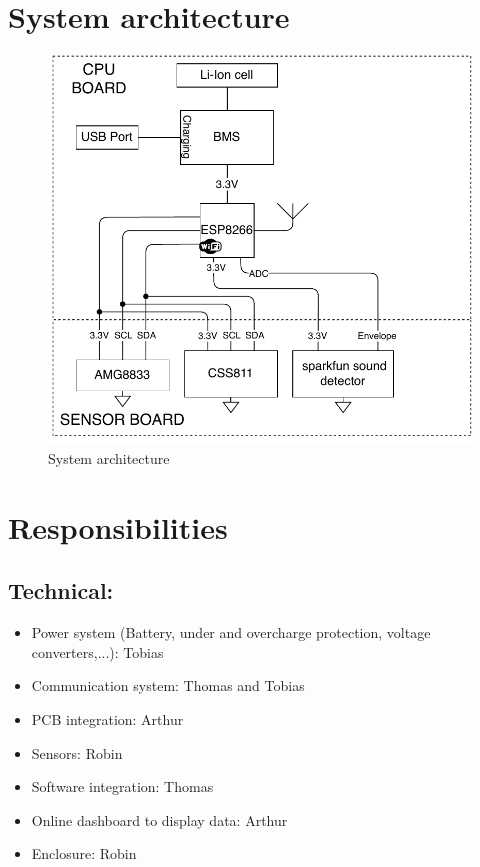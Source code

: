 \documentclass[11pt,a4paper]{article}
\begin{document}
	\section{System architecture}
	\begin{figure}[!ht]
		\centering
		\includegraphics[width=1\linewidth]{architecture.pdf}
		\caption{System architecture}
		\label{fig:situation}
	\end{figure} 

	\section{Responsibilities}
	\subsection{Technical:}
	\begin{itemize}
		\item Power system (Battery, under and overcharge protection, voltage converters,...): Tobias
		\item Communication system: Thomas and Tobias
		\item PCB integration: Arthur
		\item Sensors: Robin
		\item Software integration: Thomas
		\item Online dashboard to display data: Arthur
		\item Enclosure: Robin
	\end{itemize}
\end{document}
